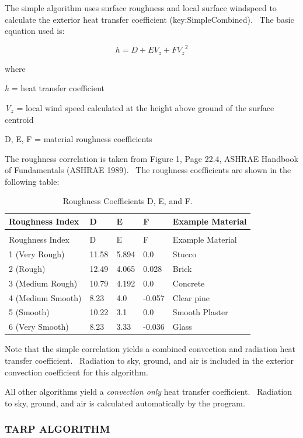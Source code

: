 The simple algorithm uses surface roughness and local surface windspeed to calculate the exterior heat transfer coefficient (key:SimpleCombined).~ The basic equation used is:

\begin{equation}
h = D + E{V_z} + F{V_z}^2
\end{equation}

where

\emph{h} = heat transfer coefficient

\emph{V\(_{z}\)} = local wind speed calculated at the height above ground of the surface centroid

D, E, F = material roughness coefficients

The roughness correlation is taken from Figure 1, Page 22.4, ASHRAE Handbook of Fundamentals (ASHRAE 1989).~ The roughness coefficients are shown in the following table:

\begin{longtable}[c]{@{}lllll@{}}
\caption{Roughness Coefficients D, E, and F. \label{table:roughness-coefficients-d-e-and-f.}} \tabularnewline
\toprule
Roughness Index & D & E & F & Example Material \tabularnewline
\midrule
\endfirsthead

\caption[]{Roughness Coefficients D, E, and F.} \tabularnewline
\toprule
Roughness Index & D & E & F & Example Material \tabularnewline
\midrule
\endhead

1 (Very Rough) & 11.58 & 5.894 & 0.0 & Stucco \tabularnewline
2 (Rough) & 12.49 & 4.065 & 0.028 & Brick \tabularnewline
3 (Medium Rough) & 10.79 & 4.192 & 0.0 & Concrete \tabularnewline
4 (Medium Smooth) & 8.23 & 4.0 & -0.057 & Clear pine \tabularnewline
5 (Smooth) & 10.22 & 3.1 & 0.0 & Smooth Plaster \tabularnewline
6 (Very Smooth) & 8.23 & 3.33 & -0.036 & Glass \tabularnewline
\bottomrule
\end{longtable}

Note that the simple correlation yields a combined convection and radiation heat transfer coefficient.~ Radiation to sky, ground, and air is included in the exterior convection coefficient for this algorithm.

All other algorithms yield a \emph{convection only} heat transfer coefficient.~ Radiation to sky, ground, and air is calculated automatically by the program.

\subsubsection{TARP ALGORITHM}\label{tarp-algorithm-000}

